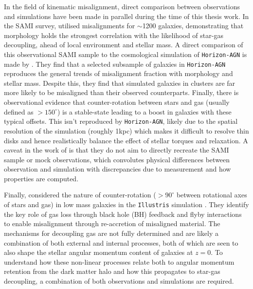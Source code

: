 In the field of kinematic misalignment, direct comparison between observations and simulations have been made in parallel during the time of this thesis work. In the SAMI survey, \citet{bryant2019} utilised misalignments for $\sim$1200 galaxies, demonstrating that morphology holds the strongest correlation with the likelihood of star-gas decoupling, ahead of local environment and stellar mass. A direct comparison of this observational SAMI sample to the cosmological simulation of \texttt{Horizon-AGN} is made by \citet{khim2019}. They find that a selected subsample of galaxies in \texttt{Horizon-AGN} reproduces the general trends of misalignment fraction with morphology and stellar mass. Despite this, they find that simulated galaxies in clusters are far more likely to be misaligned than their observed counterparts. Finally, there is observational evidence \citep[e.g.][]{davis2016, chen2016} that counter-rotation between stars and gas (usually defined as $> 150^{\circ}$) is a stable-state leading to a boost in galaxies with these typical offsets. This isn't reproduced by \texttt{Horizon-AGN}, likely due to the spatial resolution of the simulation (roughly 1kpc) which makes it difficult to resolve thin disks and hence realistically balance the effect of stellar torques and relaxation. A caveat in the work of \citet{khim2019} is that they do not aim to directly recreate the SAMI sample or mock observations, which convolutes physical differences between observation and simulation with discrepancies due to measurement and how properties are computed. 

Finally, \citet{starkenburg+19} considered the nature of counter-rotation ($\mathrm{> 90^{\circ}}$ between rotational axes of stars and gas) in low mass galaxies in the \texttt{Illustris} simulation \citep{vogelsberger2014a, vogelsberger2014b, genel2014, sijacki2015}. They identify the key role of gas loss through black hole (BH) feedback and flyby interactions to enable misalignment through re-accretion of misaligned material. The mechanisms for decoupling gas are not fully determined and are likely a combination of both external and internal processes, both of which are seen to also shape the stellar angular momentum content of galaxies at $z=0$. To understand how these non-linear processes relate both to angular momentum retention from the dark matter halo and how this propagates to star-gas decoupling, a combination of both observations and simulations are required. 

